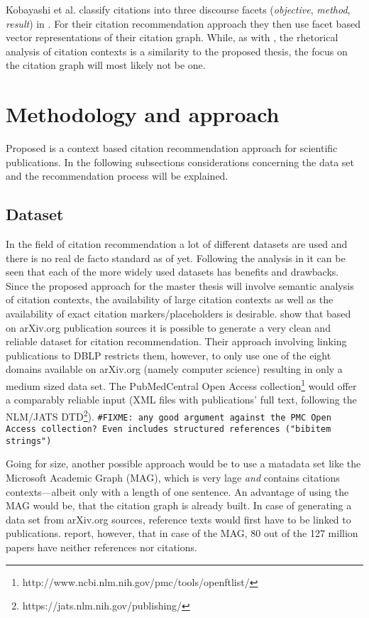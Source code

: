 \documentclass{proseminar}
\begin{document}
Kobayashi et al. classify citations into three discourse facets (\emph{objective}, \emph{method}, \emph{result}) in \cite{Kobayashi2018}. For their citation recommendation approach they then use facet based vector representations of their citation graph. While, as with \cite{Duma2016}, the rhetorical analysis of citation contexts is a similarity to the proposed thesis, the focus on the citation graph will most likely not be one.

\section{Methodology and approach}\label{meth}
Proposed is a context based citation recommendation approach for scientific publications. In the following subsections considerations concerning the data set and the recommendation process will be explained.

\subsection{Dataset}
In the field of citation recommendation a lot of different datasets are used and there is no real de facto standard as of yet. Following the analysis in \cite{Faerber} it can be seen that each of the more widely used datasets has benefits and drawbacks. Since the proposed approach for the master thesis will involve semantic analysis of citation contexts, the availability of large citation contexts as well as the availability of exact citation markers/placeholders is desirable. \cite{Faerber2018} show that based on arXiv.org publication sources it is possible to generate a very clean and reliable dataset for citation recommendation. Their approach involving linking publications to DBLP restricts them, however, to only use one of the eight domains available on arXiv.org (namely computer science) resulting in only a medium sized data set. The PubMedCentral Open Access collection\footnote{http://www.ncbi.nlm.nih.gov/pmc/tools/openftlist/} would offer a comparably reliable input (XML files with publications' full text, following the NLM/JATS DTD\footnote{https://jats.nlm.nih.gov/publishing/}). \texttt{\#FIXME: any good argument against the PMC Open Access collection? Even in\-clu\-des structured references ("bibitem strings")}

Going for size, another possible approach would be to use a matadata set like the Microsoft Academic Graph\cite{Sinha2015} (MAG), which is very lage \emph{and} contains citations contexts---albeit only with a length of one sentence. An advantage of using the MAG would be, that the citation graph is already built. In case of generating a data set from arXiv.org sources, reference texts would first have to be linked to publications. \cite{Herrmannova2016} report, however, that in case of the MAG, 80 out of the 127 million papers have neither references nor citations.
\end{document}
